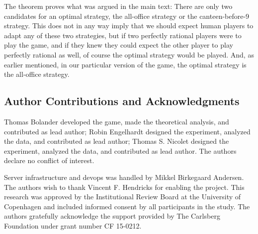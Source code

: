 \documentclass[twocolumn,a4paper,superscriptaddress,nofootinbib]{revtex4}
\newcommand{\tobo}[1]{{\color{red} TOBO: #1}}
\begin{document}
The theorem proves what was argued in the main text: There are only two candidates for an optimal strategy, the all-office strategy or the canteen-before-9 strategy. This does not in any way imply that we should expect human players to adapt any of these two strategies, but if two perfectly rational players were to play the game, and if they knew they could expect the other player to play perfectly rational as well, of course the optimal strategy would be played. And, as earlier mentioned, in our particular version of the game, the optimal strategy is the all-office strategy.



\if{}
\begin{acknowledgments}
\else
\section{Author Contributions and Acknowledgments}
\fi
Thomas Bolander developed the game, made the theoretical analysis, and contributed as lead author; Robin Engelhardt designed the experiment, analyzed the data, and contributed as lead author; Thomas S. Nicolet designed the experiment, analyzed the data, and contributed as lead author. The authors declare no conflict of interest.

Server infrastructure and devops was handled by Mikkel Birkegaard Andersen. The authors wish to thank Vincent F. Hendricks for enabling the project. This research was approved by the Institutional Review Board at the University of Copenhagen and included informed consent by all participants in the study. The authors gratefully acknowledge the support provided by The Carlsberg Foundation under grant number CF 15-0212.

\if{}
\end{acknowledgments}
\fi


\end{document}
